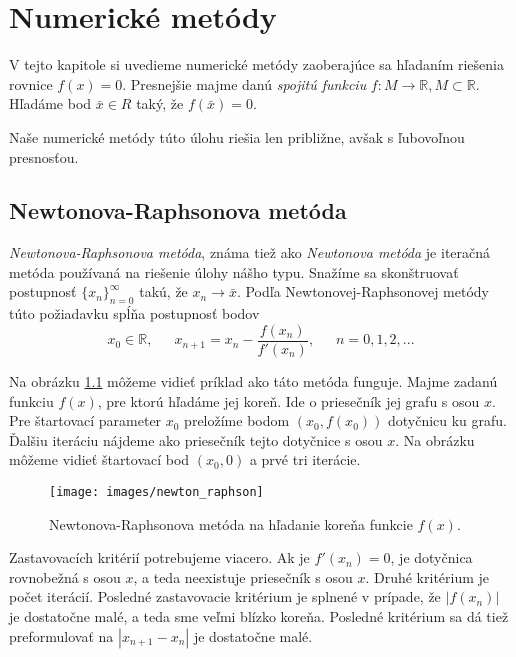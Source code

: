 
\chapter{Numerické metódy}
\label{kap:numeric_methods}

V tejto kapitole si uvedieme numerické metódy zaoberajúce sa hľadaním riešenia rovnice $f(x) = 0$.
Presnejšie majme danú \textit{spojitú funkciu} $f: M \to \mathbb{R}, M \subset \mathbb{R}$. Hľadáme bod
$\bar{x} \in R$ taký, že $f(\bar{x}) = 0$.

Naše numerické metódy túto úlohu riešia len približne, avšak s ľubovoľnou presnosťou.

\section{Newtonova-Raphsonova metóda}

\textit{Newtonova-Raphsonova metóda}, známa tiež ako \textit{Newtonova metóda} je iteračná metóda používaná na riešenie
úlohy nášho typu. Snažíme sa skonštruovať postupnosť $\{x_n\}_{n=0}^\infty$ takú, že $x_n \to \bar{x}$.
Podľa Newtonovej-Raphsonovej metódy túto požiadavku spĺňa postupnosť bodov
$$x_0 \in \mathbb{R}, \,\,\,\,\,\,\,\,\, x_{n+1} = x_n - \frac{f(x_n)}{f'(x_n)}, \,\,\,\,\,\,\,\,\, n = 0, 1, 2, ...$$

Na obrázku \ref{obr:newton_raphson} môžeme vidieť príklad ako táto metóda funguje. Majme zadanú funkciu
$f(x)$, pre ktorú hľadáme jej koreň. Ide o priesečník jej grafu s osou $x$. Pre štartovací parameter
$x_0$ preložíme bodom $(x_0, f(x_0))$ dotyčnicu ku grafu. Ďalšiu iteráciu nájdeme ako priesečník tejto 
dotyčnice s osou $x$. Na obrázku môžeme vidieť štartovací bod $(x_0, 0)$ a prvé tri iterácie.

\begin{figure}
    \centerline{\texttt{[image: images/newton\_raphson]}}
    \caption[Newtonova-Raphsonova metóda]{Newtonova-Raphsonova metóda na hľadanie koreňa funkcie $f(x)$.}
    \label{obr:newton_raphson}
\end{figure}

Zastavovacích kritérií potrebujeme viacero. Ak je $f'(x_n) = 0$, je dotyčnica rovnobežná
s osou $x$, a teda neexistuje priesečník s osou $x$. Druhé kritérium je počet iterácií. 
Posledné zastavovacie kritérium je splnené v prípade, že $|f(x_n)|$ je dostatočne 
malé, a teda sme veľmi blízko koreňa. Posledné kritérium sa dá tiež preformulovať na $|x_{n+1} - x_n|$ 
je dostatočne malé.

